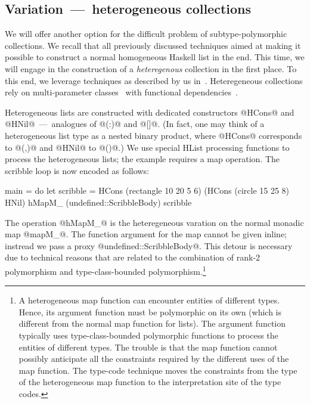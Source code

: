 \documentclass{jfp}
\begin{document}
\subsection{Variation~---~heterogeneous collections}
\label{S:hetero}

We will offer another option for the difficult problem of
subtype-polymorphic collections. We recall that all previously
discussed techniques aimed at making it possible to construct a normal
homogeneous Haskell list in the end. This time, we will engage in the
construction of a \emph{heteregenous} collection in the first
place. To this end, we leverage techniques as described by us
in~\cite{HLIST-HW04}. Heteregeneous collections rely on
multi-parameter classes~\cite{CHO92,MPJ92,MPJ95,PJJM97} with
functional dependencies~\cite{MPJ00,DPJSS04}.

Heterogeneous lists are constructed with dedicated constructors
@HCons@ and @HNil@~---~analogues of @(:)@ and @[]@. (In fact, one may
think of a heterogeneous list type as a nested binary product, where
@HCons@ corresponds to @(,)@ and @HNil@ to @()@.) We use special
HList processing functions to process the heterogeneous lists; the
example requires a map operation. The scribble loop is now encoded as
follows:

\begin{code}
main =
      do
         let scribble =  HCons (rectangle 10 20 5 6)
                        (HCons (circle 15 25 8)
                         HNil)
         hMapM_ (undefined::ScribbleBody) scribble
\end{code}

 The operation @hMapM_@ is the heteregeneous varation on the normal
 monadic map @mapM_@. The function argument for the map cannot be
 given inline; instread we pass a proxy
 @undefined::ScribbleBody@. This detour is necessary due to technical
 reasons that are related to the combination of rank-2 polymorphism
 and type-class-bounded polymorphism.\footnote{\small A heterogeneous
 map function can encounter entities of different types. Hence, its
 argument function must be polymorphic on its own (which is different
 from the normal map function for lists). The argument function
 typically uses type-class-bounded polymorphic functions to process
 the entities of different types. The trouble is that the map function
 cannot possibly anticipate all the constraints required by the
 different uses of the map function. The type-code technique moves the
 constraints from the type of the heterogeneous map function to the
 interpretation site of the type codes.}
\end{document}
